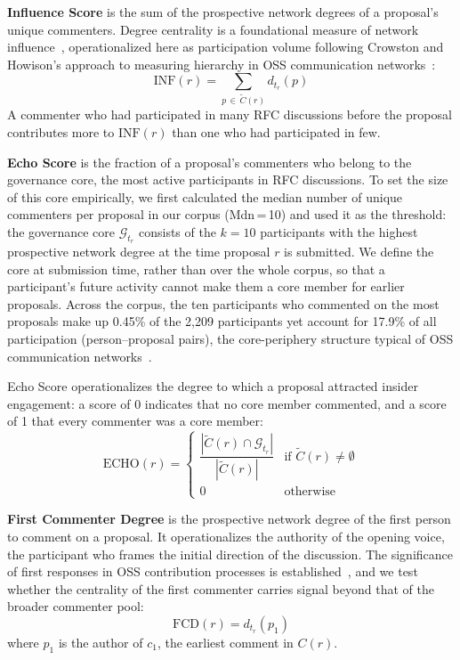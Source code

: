 \documentclass[conference]{IEEEtran}
\begin{document}
\textbf{Influence Score} is the sum of the prospective network degrees of a proposal's unique commenters. Degree centrality is a foundational measure of network influence~\cite{freeman1978centrality, wasserman1994social}, operationalized here as participation volume following Crowston and Howison's approach to measuring hierarchy in OSS communication networks~\cite{crowston2006hierarchy}:
\begin{equation}
  \text{INF}(r) = \sum_{p \,\in\, \tilde{C}(r)} d_{t_r}(p)
  \label{eq:inf}
\end{equation}
A commenter who had participated in many RFC discussions before the proposal contributes more to $\text{INF}(r)$ than one who had participated in few.

\textbf{Echo Score} is the fraction of a proposal's commenters who belong to the governance core, the most active participants in RFC discussions. To set the size of this core empirically, we first calculated the median number of unique commenters per proposal in our corpus (Mdn\,=\,10) and used it as the threshold: the governance core $\mathcal{G}_{t_r}$ consists of the $k = 10$ participants with the highest prospective network degree at the time proposal $r$ is submitted. We define the core at submission time, rather than over the whole corpus, so that a participant's future activity cannot make them a core member for earlier proposals. Across the corpus, the ten participants who commented on the most proposals make up 0.45\% of the 2,209 participants yet account for 17.9\% of all participation (person--proposal pairs), the core-periphery structure typical of OSS communication networks~\cite{crowston2005social}.

Echo Score operationalizes the degree to which a proposal attracted insider engagement: a score of 0 indicates that no core member commented, and a score of 1 that every commenter was a core member:
\begin{equation}
  \text{ECHO}(r) =
  \begin{cases}
    \dfrac{|\tilde{C}(r) \cap \mathcal{G}_{t_r}|}{|\tilde{C}(r)|} & \text{if } \tilde{C}(r) \neq \emptyset \\[8pt]
    0 & \text{otherwise}
  \end{cases}
  \label{eq:echo}
\end{equation}

\textbf{First Commenter Degree} is the prospective network degree of the first person to comment on a proposal. It operationalizes the authority of the opening voice, the participant who frames the initial direction of the discussion. The significance of first responses in OSS contribution processes is established~\cite{assavakamhaenghan2023does, yue2022off}, and we test whether the centrality of the first commenter carries signal beyond that of the broader commenter pool:
\begin{equation}
  \text{FCD}(r) = d_{t_r}(p_1)
  \label{eq:fcd}
\end{equation}
where $p_1$ is the author of $c_1$, the earliest comment in $C(r)$.
\end{document}
